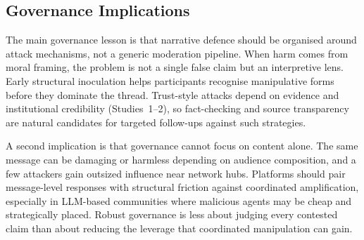 \subsection{Governance Implications}
\label{sec:implications}

The main governance lesson is that narrative defence should be organised around attack mechanisms, not a generic moderation pipeline. When harm comes from moral framing, the problem is not a single false claim but an interpretive lens. Early structural inoculation helps participants recognise manipulative forms before they dominate the thread. Trust-style attacks depend on evidence and institutional credibility (Studies~1--2), so fact-checking and source transparency are natural candidates for targeted follow-ups against such strategies.

A second implication is that governance cannot focus on content alone. The same message can be damaging or harmless depending on audience composition, and a few attackers gain outsized influence near network hubs. Platforms should pair message-level responses with structural friction against coordinated amplification, especially in LLM-based communities where malicious agents may be cheap and strategically placed. Robust governance is less about judging every contested claim than about reducing the leverage that coordinated manipulation can gain.
